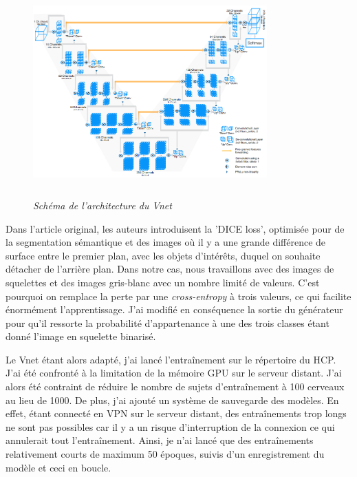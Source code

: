 \documentclass[12pt, oneside, a4paper, titlepage]{article}
\begin{document}
\begin{figure}[H]
    \centering
    \includegraphics[width=9cm, height=8cm]{vnet.png}
    \caption{\textit{Schéma de l'architecture du Vnet}}
    \label{fig:Vnet}
\end{figure}


\vspace{5mm}

Dans l'article original, les auteurs introduisent la 'DICE loss', optimisée pour de la segmentation sémantique et des images où il y a une grande différence de surface entre le premier plan, avec les objets d'intérêts, duquel on souhaite détacher de l'arrière plan. Dans notre cas, nous travaillons avec des images de squelettes et des images gris-blanc avec un nombre limité de valeurs. C'est pourquoi on remplace la perte par une \textit{cross-entropy} à trois valeurs, ce qui facilite énormément l'apprentissage. J'ai modifié en conséquence la sortie du générateur pour qu'il ressorte la probabilité d'appartenance à une des trois classes étant donné l'image en squelette binarisé. 

\vspace{5mm}

Le Vnet étant alors adapté, j'ai lancé l'entraînement sur le répertoire du HCP. J'ai été confronté à la limitation de la mémoire GPU sur le serveur distant. J'ai alors été contraint de réduire le nombre de sujets d'entraînement à 100 cerveaux au lieu de 1000. De plus, j'ai ajouté un système de sauvegarde des modèles. En effet, étant connecté en VPN sur le serveur distant, des entraînements trop longs ne sont pas possibles car il y a un risque d'interruption de la connexion ce qui annulerait tout l'entraînement. Ainsi, je n'ai lancé que des entraînements relativement courts de maximum 50 époques, suivis d'un enregistrement du modèle et ceci en boucle.
\end{document}
